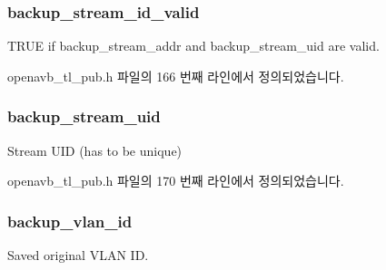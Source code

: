 \subsubsection[{\texorpdfstring{backup\+\_\+stream\+\_\+id\+\_\+valid}{backup_stream_id_valid}}]{ backup\+\_\+stream\+\_\+id\+\_\+valid}\hypertarget{structopenavb__tl__cfg__t_ace9ae11a07a223977fbe329b93d1191b}{}\label{structopenavb__tl__cfg__t_ace9ae11a07a223977fbe329b93d1191b}


T\+R\+UE if backup\+\_\+stream\+\_\+addr and backup\+\_\+stream\+\_\+uid are valid. 



openavb\+\_\+tl\+\_\+pub.\+h 파일의 166 번째 라인에서 정의되었습니다.

\subsubsection[{\texorpdfstring{backup\+\_\+stream\+\_\+uid}{backup_stream_uid}}]{ backup\+\_\+stream\+\_\+uid}\hypertarget{structopenavb__tl__cfg__t_ad1dc4ed4c6d3ec8f5a278090efd39aeb}{}\label{structopenavb__tl__cfg__t_ad1dc4ed4c6d3ec8f5a278090efd39aeb}


Stream U\+ID (has to be unique) 



openavb\+\_\+tl\+\_\+pub.\+h 파일의 170 번째 라인에서 정의되었습니다.

\subsubsection[{\texorpdfstring{backup\+\_\+vlan\+\_\+id}{backup_vlan_id}}]{ backup\+\_\+vlan\+\_\+id}\hypertarget{structopenavb__tl__cfg__t_adc2b5db884c2baf180058e1a60dd3614}{}\label{structopenavb__tl__cfg__t_adc2b5db884c2baf180058e1a60dd3614}


Saved original V\+L\+AN ID. 



